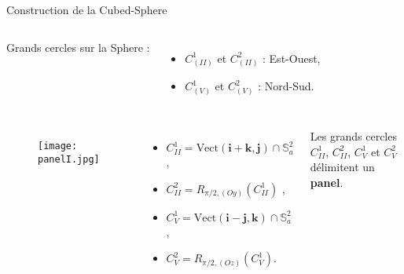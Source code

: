 \documentclass[11pt]{beamer}
\def\Vect{\text{Vect}}
\begin{document}
\begin{frame}{Construction de la Cubed-Sphere}
\begin{block}{}
\begin{columns}
Grands cercles sur la Sphere :
\begin{itemize}
\item $C_{(II)}^1$ et $C_{(II)}^2$ : Est-Ouest,
\item $C_{(V)}^1$ et $C_{(V)}^2$ : Nord-Sud.
\end{itemize}
\end{columns}
\end{block}

\begin{columns}
\begin{figure}[htbp]
\begin{center}
\texttt{[image: panelI.jpg]}
\end{center}
\end{figure}
\begin{itemize}
\item $C_{II}^1 = \Vect(\mathbf{i}+\mathbf{k}, \mathbf{j}) \cap \mathbb{S}_a^2$,
\item $C_{II}^2 = R_{\pi/2, (Oy)} ( C_{II}^1 )$ ,
\item $C_V^1 = \Vect(\mathbf{i}-\mathbf{j}, \mathbf{k}) \cap \mathbb{S}_a^2$,
\item $C_V^2 = R_{\pi/2, (Oz)} (C_{V}^1 )$.
\end{itemize}
\begin{block}{}
Les grands cercles $C_{II}^1$, $C_{II}^2$, $C_V^1$ et $C_V^2$ délimitent un \textbf{panel}.
\end{block}
\end{columns}
\end{frame}
\end{document}
